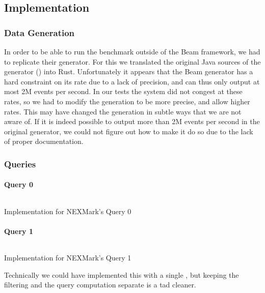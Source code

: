 \subsection{Implementation}
\subsubsection{Data Generation}
In order to be able to run the benchmark outside of the Beam framework, we had to replicate their generator. For this we translated the original Java sources of the generator () into Rust. Unfortunately it appears that the Beam generator has a hard constraint on its rate due to a lack of precision, and can thus only output at most 2M events per second. In our tests the system did not congest at these rates, so we had to modify the generation to be more precise, and allow higher rates. This may have changed the generation in subtle ways that we are not aware of. If it is indeed possible to output more than 2M events per second in the original generator, we could not figure out how to make it do so due to the lack of proper documentation.

\subsubsection{Queries}
\paragraph{Query 0}
\begin{listing}[H]
  \inputminted[firstline=400,lastline=400]{rust}{benchmarks/src/nexmark.rs}
  \caption{Implementation for NEXMark's Query 0}
  \label{lst:nexmark-query0}
\end{listing}

\paragraph{Query 1}\label{sec:query1}
\begin{listing}[H]
  \inputminted[firstline=425,lastline=427]{rust}{benchmarks/src/nexmark.rs}
  \caption{Implementation for NEXMark's Query 1}
  \label{lst:nexmark-query1}
\end{listing}

Technically we could have implemented this with a single , but keeping the filtering and the query computation separate is a tad cleaner.

